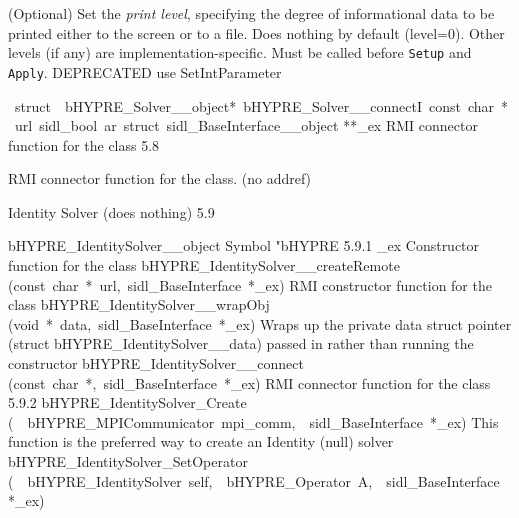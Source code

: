 \documentclass{article}
\begin{document}
\begin{cxxentry}
\begin{cxxfunction}
\begin{cxxdoc}
(Optional) Set the {\it print level}, specifying the degree
of informational data to be printed either to the screen or
to a file.  Does nothing by default (level=0).  Other levels
(if any) are implementation-specific.  Must be called before
{\tt Setup} and {\tt Apply}.
DEPRECATED   use SetIntParameter
\end{cxxdoc}
\end{cxxfunction}
\begin{cxxvariable}
{\ struct\ \ bHYPRE\_Solver\_\_object*\ bHYPRE\_Solver\_\_connectI\ const\ char\ *\ url\ sidl\_bool\ ar\ struct\ sidl\_BaseInterface\_\_object}
        {**\_ex}
        {}
        {
RMI connector function for the class}
        {5.8}
\begin{cxxdoc}

RMI connector function for the class. (no addref)
\end{cxxdoc}
\end{cxxvariable}
\begin{cxxentry}
{}
        {Identity Solver (does nothing)}
        {}
        {
}
        {5.9}
\begin{cxxnames}
        {bHYPRE\_IdentitySolver\_\_object}
        {}
        {
Symbol "bHYPRE}
        {5.9.1}
        {\_ex}
        {}
        {
Constructor function for the class}
        {}
\label{cxx.5.9.11}
        {bHYPRE\_IdentitySolver\_\_createRemote}
        {(const\ char\ *\ url,\ sidl\_BaseInterface\ *\_ex)}
        {
RMI constructor function for the class}
        {}
\label{cxx.5.9.12}
        {bHYPRE\_IdentitySolver\_\_wrapObj}
        {(void\ *\ data,\ sidl\_BaseInterface\ *\_ex)}
        {
Wraps up the private data struct pointer (struct bHYPRE\_IdentitySolver\_\_data) passed in rather than running the constructor}
        {}
\label{cxx.5.9.13}
        {bHYPRE\_IdentitySolver\_\_connect}
        {(const\ char\ *,\ sidl\_BaseInterface\ *\_ex)}
        {
RMI connector function for the class}
        {5.9.2}
        {bHYPRE\_IdentitySolver\_Create}
        {(\ \ bHYPRE\_MPICommunicator\ mpi\_comm,\ \ sidl\_BaseInterface\ *\_ex)}
        {
This function is the preferred way to create an Identity (null) solver}
        {}
\label{cxx.5.9.14}
        {bHYPRE\_IdentitySolver\_SetOperator}
        {(\ \ bHYPRE\_IdentitySolver\ self,\ \ bHYPRE\_Operator\ A,\ \ sidl\_BaseInterface\ *\_ex)}

\end{cxxnames}
\end{cxxentry}
\end{cxxentry}
\end{document}
